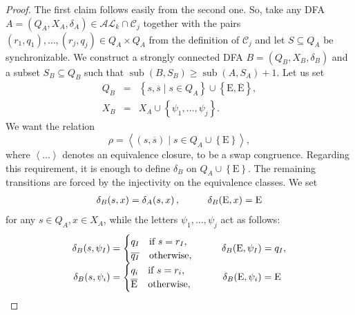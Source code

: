 \documentclass{ws-ijmpc}
\DeclareMathOperator{\sub}{sub}
\begin{document}
\begin{proof}
The first claim follows easily from the second one. So, take any DFA
$A=\left(Q_{A},X_{A},\delta_{A}\right)\in\mathcal{AL}_{k}\cap\mathcal{C}_{j}$
together with the pairs $\left(r_{1},q_{1}\right),\dots,\left(r_{j},q_{j}\right)\in Q_{A}\times Q_{A}$
from the definition of $\mathcal{C}_{j}$ and let $S\subseteq Q_{A}$
be synchronizable. We construct a strongly connected DFA $B=\left(Q_{B},X_{B},\delta_{B}\right)$
and a subset $S_{B}\subseteq Q_{B}$ such that $\sub\left(B,S_{B}\right)\ge\sub\left(A,S_{A}\right)+1$.
Let us set
\begin{eqnarray*}
Q_{B} & = & \left\{ s,\overline{s}\mid s\in Q_{A}\right\} \cup\left\{ \mathrm{E},\overline{\mathrm{E}}\right\} ,\\
X_{B} & = & X_{A}\cup\left\{ \psi_{1},\dots,\psi_{j}\right\} .
\end{eqnarray*}
We want the relation
\[
\rho=\left\langle \left(s,\overline{s}\right)\mid s\in Q_{A}\cup\left\{ \mathrm{E}\right\} \right\rangle ,
\]
where $\left\langle \dots\right\rangle $ denotes an equivalence closure,
to be a swap congruence. Regarding this requirement, it is enough
to define $\delta_{B}$ on $Q_{A}\cup\left\{ \mathrm{E}\right\} $.
The remaining transitions are forced by the injectivity on the equivalence
classes. We set
\[
\begin{array}{cc}
\delta_{B}\!\left(s,x\right)=\delta_{A}\!\left(s,x\right),\hspace{20bp} & \delta_{B}\!\left(\mathrm{E},x\right)=\mathrm{E}\end{array}
\]
for any $s\in Q_{A},x\in X_{A}$, while the letters $\psi_{1},\dots,\psi_{j}$
act as follows: 
\[
\begin{array}{cc}
\delta_{B}\!\left(s,\psi_{I}\right)=\begin{cases}
q_{I} & \mbox{if }s=r_{I},\\
\overline{q_{I}} & \mbox{otherwise},
\end{cases}\hspace{20bp} & \delta_{B}\!\left(\mathrm{E},\psi_{I}\right)=q_{I},\\
\delta_{B}\!\left(s,\psi_{i}\right)=\begin{cases}
q_{i} & \mbox{if }s=r_{i},\\
\overline{\mathrm{E}} & \mbox{otherwise},
\end{cases}\hspace{20bp} & \delta_{B}\!\left(\mathrm{E},\psi_{i}\right)=\mathrm{E}\hspace{4bp}
\end{array}
\]
\end{proof}
\end{document}
